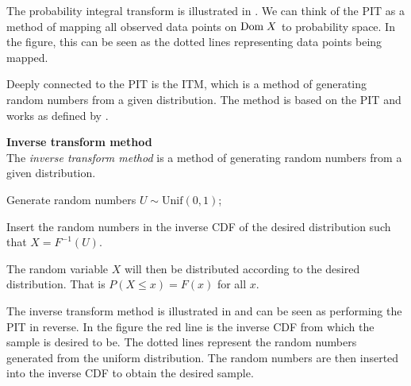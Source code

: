 The probability integral transform is illustrated in . We can think of the \gls{PIT} as a method of mapping all observed data points on $\mathrm{Dom \;} X$  to probability space. In the figure, this can be seen as the dotted lines representing data points being mapped. 

Deeply connected to the \gls{PIT} is the \gls{ITM}, which is a method of generating random numbers from a given distribution. The method is based on the \gls{PIT} and works as defined by .
\begin{definition}\label{def:InverseTransformMethod}
    \textbf{Inverse transform method} \\
    The \emph{inverse transform method} is a method of generating random numbers from a given distribution.
    \begin{compactenum}
        \item Generate random numbers $U \sim \mathrm{Unif}(0,1)$;
        \item Insert the random numbers in the inverse \gls{CDF} of the desired distribution such that $X = F^{-1}(U)$.
    \end{compactenum}
    The random variable $X$ will then be distributed according to the desired distribution. That is $P(X\leq x) = F(x)$ for all $x$.
\end{definition}

The inverse transform method is illustrated in  and can be seen as performing the \gls{PIT} in reverse. In the figure the red line is the inverse \gls{CDF} from which the sample is desired to be. The dotted lines represent the random numbers generated from the uniform distribution. The random numbers are then inserted into the inverse \gls{CDF} to obtain the desired sample.

